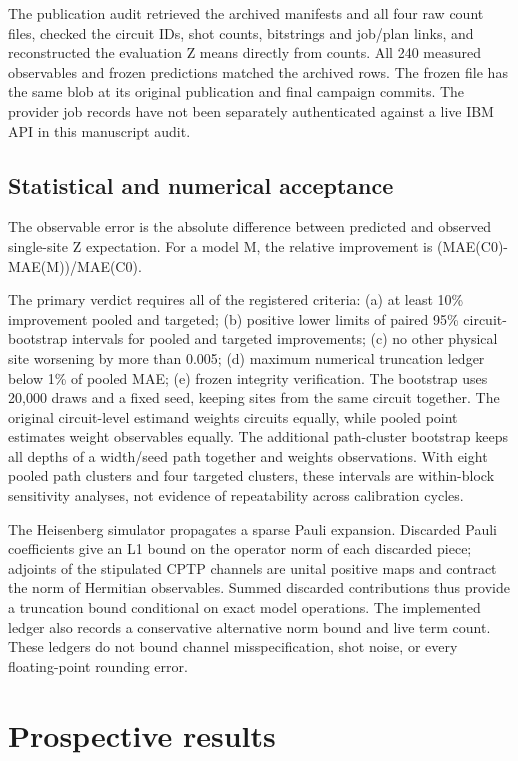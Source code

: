 \documentclass[11pt,a4paper]{article}
\begin{document}
The publication audit retrieved the archived manifests and all four raw count files, checked the circuit IDs, shot counts, bitstrings and job/plan links, and reconstructed the evaluation Z means directly from counts. All 240 measured observables and frozen predictions matched the archived rows. The frozen file has the same blob at its original publication and final campaign commits. The provider job records have not been separately authenticated against a live IBM API in this manuscript audit.

\subsection{Statistical and numerical acceptance}

The observable error is the absolute difference between predicted and observed single-site Z expectation. For a model M, the relative improvement is (MAE(C0)-MAE(M))/MAE(C0).

The primary verdict requires all of the registered criteria: (a) at least 10\% improvement pooled and targeted; (b) positive lower limits of paired 95\% circuit-bootstrap intervals for pooled and targeted improvements; (c) no other physical site worsening by more than 0.005; (d) maximum numerical truncation ledger below 1\% of pooled MAE; (e) frozen integrity verification. The bootstrap uses 20,000 draws and a fixed seed, keeping sites from the same circuit together. The original circuit-level estimand weights circuits equally, while pooled point estimates weight observables equally. The additional path-cluster bootstrap keeps all depths of a width/seed path together and weights observations. With eight pooled path clusters and four targeted clusters, these intervals are within-block sensitivity analyses, not evidence of repeatability across calibration cycles.

The Heisenberg simulator propagates a sparse Pauli expansion. Discarded Pauli coefficients give an L1 bound on the operator norm of each discarded piece; adjoints of the stipulated CPTP channels are unital positive maps and contract the norm of Hermitian observables. Summed discarded contributions thus provide a truncation bound conditional on exact model operations. The implemented ledger also records a conservative alternative norm bound and live term count. These ledgers do not bound channel misspecification, shot noise, or every floating-point rounding error.

\section{Prospective results}
\end{document}
